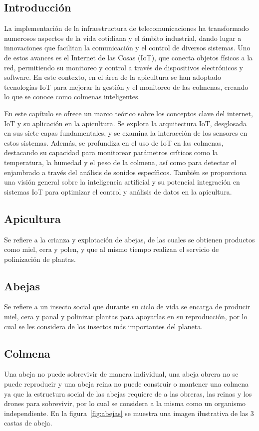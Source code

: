 \subsection{Introducción}
La implementación de la infraestructura de telecomunicaciones ha transformado numerosos aspectos de la vida cotidiana y el ámbito industrial, dando lugar a innovaciones que facilitan la comunicación y el control de diversos sistemas. Uno de estos avances es el Internet de las Cosas (IoT), que conecta objetos físicos a la red, permitiendo su monitoreo y control a través de dispositivos electrónicos y software. En este contexto, en el área de la apicultura se han adoptado tecnologías IoT para mejorar la gestión y el monitoreo de las colmenas, creando lo que se conoce como colmenas inteligentes.

En este capítulo se ofrece un marco teórico sobre los conceptos clave del internet, IoT y su aplicación en la apicultura. Se explora la arquitectura IoT, desglosada en sus siete capas fundamentales, y se examina la interacción de los sensores en estos sistemas. Además, se profundiza en el uso de IoT en las colmenas, destacando su capacidad para monitorear parámetros críticos como la temperatura, la humedad y el peso de la colmena, así como para detectar el enjambrado a través del análisis de sonidos específicos. También se proporciona una visión general sobre la inteligencia artificial y su potencial integración en sistemas IoT para optimizar el control y análisis de datos en la apicultura.
\subsection{Apicultura}
Se refiere a la crianza y explotación de abejas, de las cuales se obtienen productos como miel, cera y polen, y que al mismo tiempo realizan el servicio de polinización de plantas.

\subsection{Abejas}
Se refiere a un insecto social que durante su ciclo de vida se encarga de producir miel, cera y panal y polinizar plantas para apoyarlas en su reproducción, por lo cual se les considera de los insectos más importantes del planeta.  \cite{david_cramp}

\subsection{Colmena}
Una abeja no puede sobrevivir de manera individual, una abeja obrera no se puede reproducir y una abeja reina no puede construir o mantener una colmena ya que la estructura social de las abejas requiere de a las obreras, las reinas y los drones para sobrevivir, por lo cual se considera a la misma como un organismo independiente. \cite{david_cramp} En la figura~\ref{fig:abejas} se muestra una imagen ilustrativa de las 3 castas de abeja.

